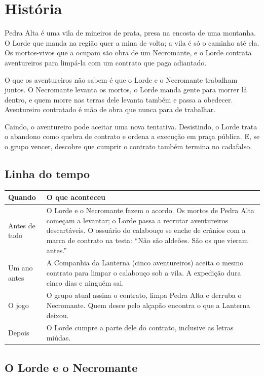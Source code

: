 \documentclass[11pt,a4paper]{article}
\begin{document}
\section{História}

Pedra Alta é uma vila de mineiros de prata, presa na encosta de uma montanha. O Lorde que manda na região quer a mina de volta; a vila é só o caminho até ela. Os mortos-vivos que a ocupam são obra de um Necromante, e o Lorde contrata aventureiros para limpá-la com um contrato que paga adiantado.

O que os aventureiros não sabem é que o Lorde e o Necromante trabalham juntos. O Necromante levanta os mortos, o Lorde manda gente para morrer lá dentro, e quem morre nas terras dele levanta também e passa a obedecer. Aventureiro contratado é mão de obra que nunca para de trabalhar.

Caindo, o aventureiro pode aceitar uma nova tentativa. Desistindo, o Lorde trata o abandono como quebra de contrato e ordena a execução em praça pública. E, se o grupo vencer, descobre que cumprir o contrato também termina no cadafalso.

\subsection{Linha do tempo}

\begin{xltabular}{\textwidth}{@{}lX@{}}
\toprule
\textbf{Quando} & \textbf{O que aconteceu} \\
\midrule
Antes de tudo & O Lorde e o Necromante fazem o acordo. Os mortos de Pedra Alta começam a levantar; o Lorde passa a recrutar aventureiros descartáveis. O ossuário do calabouço se enche de crânios com a marca de contrato na testa: ``Não são aldeões. São os que vieram antes.'' \\
Um ano antes & A Companhia da Lanterna (cinco aventureiros) aceita o mesmo contrato para limpar o calabouço sob a vila. A expedição dura cinco dias e ninguém sai. \\
O jogo & O grupo atual assina o contrato, limpa Pedra Alta e derruba o Necromante. Quem desce pelo alçapão encontra o que a Lanterna deixou. \\
Depois & O Lorde cumpre a parte dele do contrato, inclusive as letras miúdas. \\
\bottomrule
\end{xltabular}

\subsection{O Lorde e o Necromante}
\end{document}
